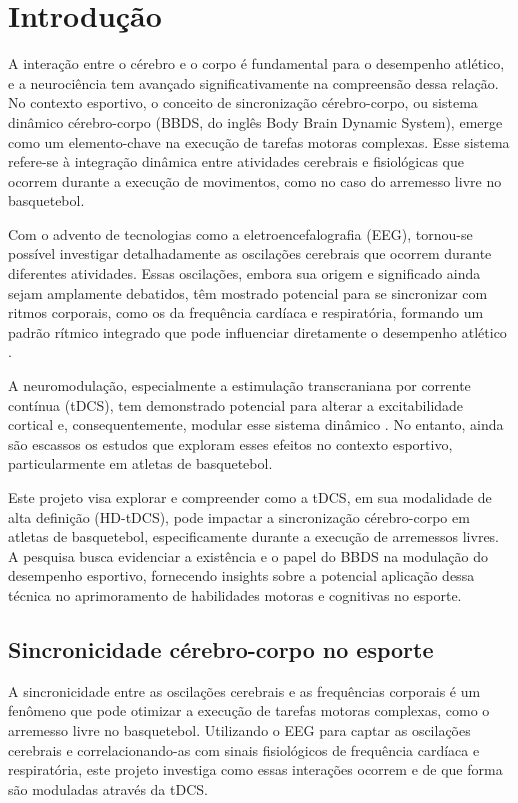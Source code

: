 \chapter{Introdução}
\label{chap:introducao}

A interação entre o cérebro e o corpo é fundamental para o desempenho atlético, e a neurociência tem avançado significativamente na compreensão dessa relação. No contexto esportivo, o conceito de sincronização cérebro-corpo, ou sistema dinâmico cérebro-corpo (BBDS, do inglês Body Brain Dynamic System), emerge como um elemento-chave na execução de tarefas motoras complexas. Esse sistema refere-se à integração dinâmica entre atividades cerebrais e fisiológicas que ocorrem durante a execução de movimentos, como no caso do arremesso livre no basquetebol.

Com o advento de tecnologias como a eletroencefalografia (EEG), tornou-se possível investigar detalhadamente as oscilações cerebrais que ocorrem durante diferentes atividades. Essas oscilações, embora sua origem e significado ainda sejam amplamente debatidos, têm mostrado potencial para se sincronizar com ritmos corporais, como os da frequência cardíaca e respiratória, formando um padrão rítmico integrado que pode influenciar diretamente o desempenho atlético \cite{criscuolo2022, cohen2017}.

A neuromodulação, especialmente a estimulação transcraniana por corrente contínua (tDCS), tem demonstrado potencial para alterar a excitabilidade cortical e, consequentemente, modular esse sistema dinâmico \cite{nitsche2000, stagg2011}. No entanto, ainda são escassos os estudos que exploram esses efeitos no contexto esportivo, particularmente em atletas de basquetebol.

Este projeto visa explorar e compreender como a tDCS, em sua modalidade de alta definição (HD-tDCS), pode impactar a sincronização cérebro-corpo em atletas de basquetebol, especificamente durante a execução de arremessos livres. A pesquisa busca evidenciar a existência e o papel do BBDS na modulação do desempenho esportivo, fornecendo insights sobre a potencial aplicação dessa técnica no aprimoramento de habilidades motoras e cognitivas no esporte.

\section{Sincronicidade cérebro-corpo no esporte}
A sincronicidade entre as oscilações cerebrais e as frequências corporais é um fenômeno que pode otimizar a execução de tarefas motoras complexas, como o arremesso livre no basquetebol. Utilizando o EEG para captar as oscilações cerebrais e correlacionando-as com sinais fisiológicos de frequência cardíaca e respiratória, este projeto investiga como essas interações ocorrem e de que forma são moduladas através da tDCS.

